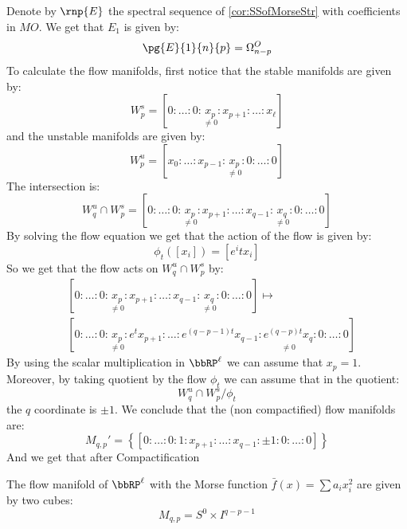 Denote by $\rnp{E}$ the spectral sequence of \cref{cor:SSofMorseStr} with coefficients in $MO$.
We get that $E_1$ is given by:
\begin{equation*}
    \pg{E}{1}{n}{p} = \Omega^O_{n-p}
\end{equation*}
To calculate the flow manifolds, first notice that the stable manifolds are given by:
\begin{equation}
    W^s_p=[0:\dots :0:\underset{\neq 0}{x_p}:x_{p+1}:\dots :x_\ell]
\end{equation}
and the unstable manifolds are given by:
\begin{equation}
    W^u_p=[x_0:\dots :x_{p-1}:\underset{\neq 0}{x_p}:0:\dots :0]
\end{equation}
The intersection is:
\begin{equation}
    W^u_q \cap W^s_p =[0:\dots :0:\underset{\neq 0}{x_p}:x_{p+1}:\dots :x_{q-1}:\underset{\neq 0}{x_q}:0:\dots :0]
\end{equation}
By solving the flow equation we get that the action of the flow is given by:
\begin{equation*}
    \phi_t([x_i])=[e^it x_i]
\end{equation*}
So we get that the flow acts on $W^u_q \cap W^s_p$ by:
\begin{align*}
    &[0:\dots :0:\underset{\neq 0}{x_p}:x_{p+1}:\dots :x_{q-1}:\underset{\neq 0}{x_q}:0:\dots :0] \mapsto \\
    &[0:\dots :0:\underset{\neq 0}{x_p}:e^t x_{p+1}:\dots :e^{(q-p-1)t} x_{q-1}:\underset{\neq 0}{e^{(q-p)t}x_q}:0:\dots :0]
\end{align*}
By using the scalar multiplication in $\bbRP^\ell$ we can assume that $x_p=1$. Moreover, by taking quotient by the flow $\phi_t$ we can assume that in the quotient:
\begin{equation*}
    W^u_q \cap W^s_p / \phi_t
\end{equation*}
the $q$ coordinate is $\pm 1$.
We conclude that the (non compactified) flow manifolds are:
\begin{equation*}
    M_{q,p}' = \left \{
    [0:\dots :0:1:x_{p+1}:\dots :x_{q-1}:\pm 1:0:\dots :0]
    \right \}
\end{equation*}
And we get that after Compactification
\begin{prop}
    The flow manifold of $\bbRP^\ell$ with the Morse function $\bar{f}(x)=\sum a_i x_i^2$ are given by two cubes:
    \begin{equation*}
        M_{q,p} = S^0 \times I^{q-p-1} 
    \end{equation*}
\end{prop}

